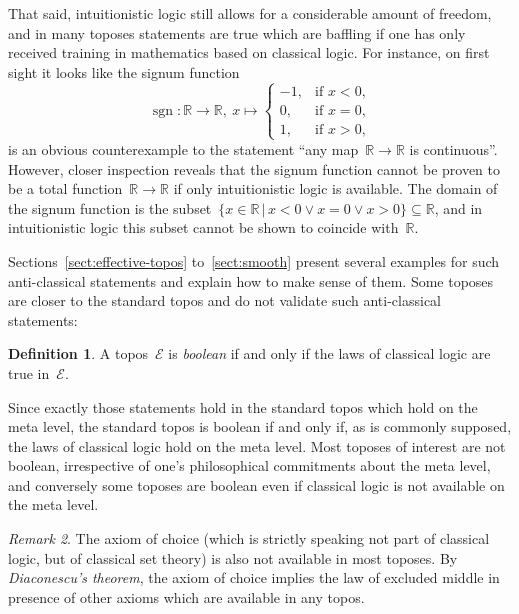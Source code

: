 \documentclass[oneside,reqno]{amsart}
\theoremstyle{definition}
\newtheorem{defn}{Definition}[section]
\theoremstyle{plain}
\theoremstyle{remark}
\newtheorem{rem}[defn]{Remark}
\newcommand{\E}{\mathcal{E}}
\newcommand{\RR}{\mathbb{R}}
\renewcommand{\_}{\mathpunct{.}\,}
\newcommand{\?}{\,{:}\,}
\begin{document}
That said, intuitionistic logic still allows for a considerable amount of
freedom, and in many toposes statements are true which are baffling if one has
only received training in mathematics based on classical logic. For instance, on first sight it
looks like the signum function
\[ \operatorname{sgn} : \RR \longrightarrow \RR,\ x \longmapsto \begin{cases}
  -1, & \text{if $x < 0$,} \\
  0, & \text{if $x = 0$,} \\
  1, & \text{if $x > 0$,}
\end{cases} \]
is an obvious counterexample to the statement ``any map~$\RR \to \RR$ is
continuous''. However, closer inspection reveals that the signum function
cannot be proven to be a total function~$\RR \to \RR$ if only intuitionistic
logic is available. The domain of the signum
function is the subset~$\{ x \in \RR \,|\, x < 0 \vee x = 0 \vee x > 0 \}
\subseteq \RR$, and in intuitionistic logic this subset cannot be shown to
coincide with~$\RR$.

Sections~\ref{sect:effective-topos} to~\ref{sect:smooth} present several
examples for such anti-classical statements and explain how to make sense of
them. Some toposes are closer to the standard topos and do not validate such
anti-classical statements:

\begin{defn}A topos~$\E$ is \emph{boolean} if and only if the laws of classical
logic are true in~$\E$.\end{defn}

Since exactly those statements hold in the standard topos which hold on the
meta level, the standard topos is boolean if and only if, as is commonly supposed, the laws
of classical logic hold on the meta level. Most toposes of interest are not
boolean, irrespective of one's philosophical commitments about the meta level,
and conversely some toposes are boolean even if classical logic is not
available on the meta level.

\begin{rem}The axiom of choice (which is strictly speaking not part of
classical logic, but of classical set theory) is also not available in most
toposes. By \emph{Diaconescu's theorem}, the axiom of choice implies the law of
excluded middle in presence of other axioms which are available in any topos.
\end{rem}

\end{document}
